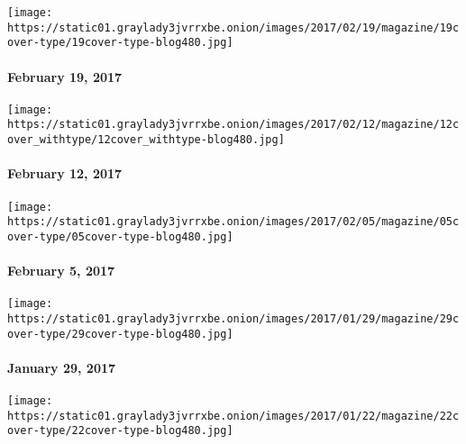 \href{http://www.nytimes3xbfgragh.onion/issue/magazine/2017/02/17/the-21917-issue-20170219}{}

\texttt{[image: https://static01.graylady3jvrrxbe.onion/images/2017/02/19/magazine/19cover-type/19cover-type-blog480.jpg]}

\hypertarget{february-19-2017}{%
\paragraph{February 19, 2017}\label{february-19-2017}}

\href{https://www.nytimes3xbfgragh.onion/issue/magazine/2017/02/10/magazine-index-20170212}{}

\texttt{[image: https://static01.graylady3jvrrxbe.onion/images/2017/02/12/magazine/12cover\_withtype/12cover\_withtype-blog480.jpg]}

\hypertarget{february-12-2017}{%
\paragraph{February 12, 2017}\label{february-12-2017}}

\href{http://www.nytimes3xbfgragh.onion/issue/magazine/2017/02/05/magazine-index}{}

\texttt{[image: https://static01.graylady3jvrrxbe.onion/images/2017/02/05/magazine/05cover-type/05cover-type-blog480.jpg]}

\hypertarget{february-5-2017}{%
\paragraph{February 5, 2017}\label{february-5-2017}}

\href{http://www.nytimes3xbfgragh.onion/issue/magazine/2017/01/27/12917-issue-20170129}{}

\texttt{[image: https://static01.graylady3jvrrxbe.onion/images/2017/01/29/magazine/29cover-type/29cover-type-blog480.jpg]}

\hypertarget{january-29-2017}{%
\paragraph{January 29, 2017}\label{january-29-2017}}

\href{http://www.nytimes3xbfgragh.onion/issue/magazine/2017/01/22/magazine-index}{}

\texttt{[image: https://static01.graylady3jvrrxbe.onion/images/2017/01/22/magazine/22cover-type/22cover-type-blog480.jpg]}

